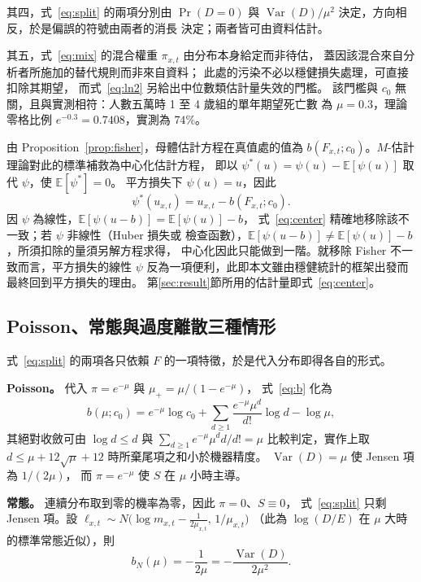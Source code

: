 \documentclass[UTF8, fontset=macnew, a4paper, 12pt]{ctexart}
\newcommand{\Ex}{\mathbb{E}}
\begin{document}
其四，式~\eqref{eq:split} 的兩項分別由 $\Pr(D=0)$ 與
$\operatorname{Var}(D)/\mu^{2}$ 決定，方向相反，於是偏誤的符號由兩者的消長
決定；兩者皆可由資料估計。

其五，式~\eqref{eq:mix} 的混合權重 $\pi_{x,t}$ 由分布本身給定而非待估，
蓋因該混合來自分析者所施加的替代規則而非來自資料；
此處的污染不必以穩健損失處理，可直接扣除其期望，
而式~\eqref{eq:ln2} 另給出中位數類估計量失效的門檻。
該門檻與 $c_0$ 無關，且與實測相符：人數五萬時 1 至 4 歲組的單年期望死亡數
為 $\mu=0.3$，理論零格比例 $e^{-0.3}=0.7408$，實測為 $74\%$。

由 Proposition~\ref{prop:fisher}，母體估計方程在真值處的值為
$b(F_{x,t};c_0)$。$M$-估計理論對此的標準補救為中心化估計方程，
即以 $\psi^{*}(u)=\psi(u)-\Ex[\psi(u)]$ 取代 $\psi$，使 $\Ex[\psi^{*}]=0$。
平方損失下 $\psi(u)=u$，因此
\begin{equation}\label{eq:center}
\psi^{*}(u_{x,t})=u_{x,t}-b(F_{x,t};c_0) .
\end{equation}
因 $\psi$ 為線性，$\Ex[\psi(u-b)]=\Ex[\psi(u)]-b$，
式~\eqref{eq:center} 精確地移除該不一致；若 $\psi$ 非線性（Huber 損失或
檢查函數），$\Ex[\psi(u-b)]\ne\Ex[\psi(u)]-b$，所須扣除的量須另解方程求得，
中心化因此只能做到一階。就移除 Fisher 不一致而言，平方損失的線性 $\psi$
反為一項便利，此即本文雖由穩健統計的框架出發而最終回到平方損失的理由。
第\ref{sec:result}節所用的估計量即式~\eqref{eq:center}。

\subsection{Poisson、常態與過度離散三種情形}\label{sec:normal}

式~\eqref{eq:split} 的兩項各只依賴 $F$ 的一項特徵，於是代入分布即得各自的形式。

\textbf{Poisson。} 代入 $\pi=e^{-\mu}$ 與 $\mu_{+}=\mu/(1-e^{-\mu})$，
式~\eqref{eq:b} 化為
\begin{equation}\label{eq:bform}
b(\mu;c_0)=e^{-\mu}\log c_0
+\sum_{d\ge1}\frac{e^{-\mu}\mu^{d}}{d!}\log d-\log\mu ,
\end{equation}
其絕對收斂可由 $\log d\le d$ 與 $\sum_{d\ge1}e^{-\mu}\mu^{d}d/d!=\mu$
比較判定，實作上取 $d\le\mu+12\sqrt{\mu}+12$ 時所棄尾項之和小於機器精度。
$\operatorname{Var}(D)=\mu$ 使 Jensen 項為 $1/(2\mu)$，
而 $\pi=e^{-\mu}$ 使 $S$ 在 $\mu$ 小時主導。

\textbf{常態。} 連續分布取到零的機率為零，因此 $\pi=0$、$S\equiv0$，
式~\eqref{eq:split} 只剩 Jensen 項。設
$\ell_{x,t}\sim N\!\big(\log m_{x,t}-\tfrac{1}{2\mu_{x,t}},\,1/\mu_{x,t}\big)$
（此為 $\log(D/E)$ 在 $\mu$ 大時的標準常態近似），則
\begin{equation}\label{eq:bnormal}
b_N(\mu)=-\frac{1}{2\mu}=-\frac{\operatorname{Var}(D)}{2\mu^{2}} .
\end{equation}
\end{document}
